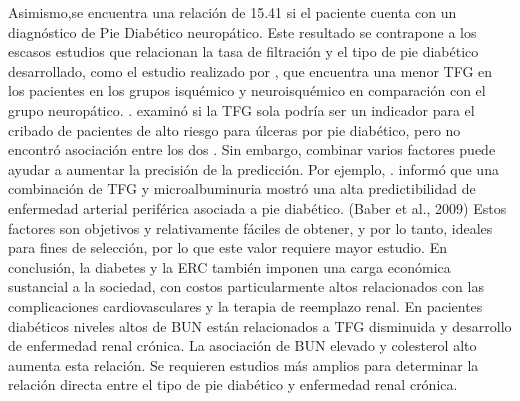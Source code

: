 \documentclass[runningheads,a4paper]{llncs}
\begin{document}
Asimismo,se encuentra una relación de 15.41 si el paciente cuenta con un diagnóstico de Pie Diabético neuropático. Este resultado se contrapone a los  escasos estudios que relacionan la tasa de filtración y el tipo de pie diabético desarrollado, como el estudio realizado por  \cite{yotsu2014comparison}, que encuentra  una menor TFG en los pacientes en los grupos isquémico y neuroisquémico en comparación con el grupo neuropático. \cite{hurley2013prospective}. examinó si la TFG sola podría ser un indicador para el cribado de pacientes de alto riesgo para úlceras por pie diabético, pero no encontró asociación entre los dos \cite{hurley2013prospective}. Sin embargo, combinar varios factores puede ayudar a aumentar la precisión de la predicción. Por ejemplo, \cite{baber2009combined}. informó que una combinación de TFG y microalbuminuria mostró una alta predictibilidad de enfermedad arterial periférica asociada a pie diabético. (Baber et al., 2009)  Estos factores son objetivos y relativamente fáciles de obtener, y por lo tanto, ideales para fines de selección,  por lo que este valor requiere mayor estudio. 
En conclusión, la diabetes y la ERC también imponen una carga económica sustancial a la sociedad, con costos particularmente altos relacionados con las complicaciones cardiovasculares y la terapia de reemplazo renal. En pacientes diabéticos niveles altos de BUN están relacionados a TFG disminuida y desarrollo de enfermedad renal crónica. La asociación de BUN elevado y colesterol alto aumenta esta relación. Se requieren  estudios más amplios para determinar la relación directa entre el tipo de pie diabético y enfermedad renal crónica.





\end{document}
